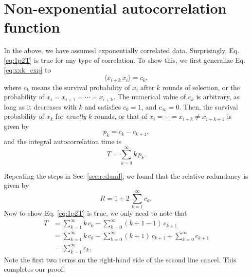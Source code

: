 \documentclass[12pt]{article}
\begin{document}
\section{Non-exponential autocorrelation function}


In the above, we have assumed exponentially correlated data.
%
Surprisingly, Eq. \eqref{eq:1p2T} is true for any type of correlation.
%
To show this, we first generalize Eq. \eqref{eq:xxk_exp} to
%
\begin{equation}
  \langle x_{i + k} \, x_i \rangle
  =
  c_k,
\end{equation}
where $c_k$ means the survival probability of $x_i$
after $k$ rounds of selection, or the probability of
$x_i = x_{i + 1} = \cdots = x_{i + k}$.
%
The numerical value of $c_k$ is arbitrary,
as long as it decreases with $k$ and satisfies
$c_0 = 1$, and $c_\infty = 0$.
%
Then, the survival probability of $x_k$ for \emph{exactly} $k$ rounds, or that of
$x_i = \cdots = x_{i + k} \ne x_{i + k + 1}$ is given by
$$
  p_k = c_k - c_{k + 1},
$$
and the integral autocorrelation time is 
$$
  T = \sum_{k = 0}^\infty k \, p_k.
$$

Repeating the steps in Sec. \ref{sec:redund}, we found that the relative redundancy is given by
%
$$
R = 1 + 2 \, \sum_{k = 1}^\infty c_k,
$$
Now to show Eq. \eqref{eq:1p2T} is true, we only need to note that
$$
\begin{aligned}
T
&=
\sum_{ k = 1 }^\infty k \, c_k
- \sum_{ k = 0 }^\infty (k + 1 - 1) \, c_{k + 1}
\\
&=
\sum_{ k = 1 }^\infty k \, c_k
-
\sum_{ k = 0 }^\infty (k + 1) \, c_{ k + 1 }
+
\sum_{ k = 0 }^\infty c_{k + 1}
\\
&=
\sum_{ k = 1 }^\infty c_k,
\end{aligned}
$$
Note the first two terms on the right-hand side of
the second line cancel.
This completes our proof.
\end{document}
